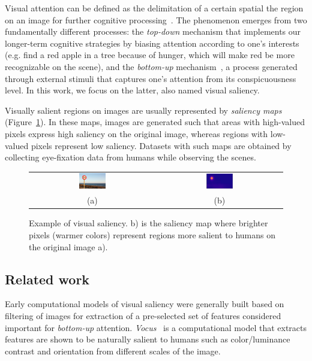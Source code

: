 \documentclass[10pt,twocolumn,letterpaper]{article}
\begin{document}
Visual attention can be defined as the delimitation of a certain spatial
the region on an image for further cognitive processing~\cite{treisman_1980}.
The phenomenon emerges from two fundamentally different processes:
the \emph{top-down} mechanism that implements our longer-term cognitive
strategies by biasing attention according to one's interests
(e.g. find a red apple in a tree because of hunger,
which will make red be more recognizable on the scene),
and the \emph{bottom-up} mechanism~\cite{colombini_2016},
a process generated through external stimuli
that captures one's attention from its conspicuousness level.
In this work, we focus on the latter, also named visual saliency.

Visually salient regions on images are usually represented by
\emph{saliency maps} (Figure~\ref{fig:example}). In these maps, images are generated such that
areas with high-valued pixels express high saliency on the original image,
whereas regions with low-valued pixels represent low saliency.
Datasets with such maps are obtained by collecting eye-fixation
data from humans while observing the scenes.

\begin{center}
\begin{figure}[t]
\begin{tabular} {cc}
\includegraphics[width=0.22\textwidth]{./img/traffic_sign_s.jpg} &
\includegraphics[width=0.22\textwidth]{./img/traffic_sign_m.jpg}\\
(a) & (b)
\end{tabular}
\caption{Example of visual saliency.
    b) is the saliency map where brighter pixels (warmer colors)
    represent regions more salient to humans on the original image a).}
\label{fig:example}
\end{figure}
\end{center}

\subsection{Related work}
Early computational models of visual saliency were generally built based on
filtering of images for extraction of a pre-selected set of features
considered important for \emph{bottom-up} attention.
\emph{Vocus}~\cite{frintrop_2005} is a computational model that extracts
features are shown to be naturally salient to humans such as color/luminance
contrast and orientation from different scales of the image.
\end{document}
